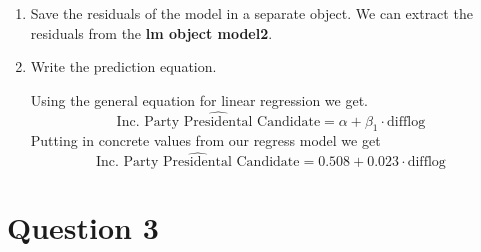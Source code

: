 \documentclass[12pt,letterpaper]{article}
\begin{document}
\begin{enumerate}
		\vspace{1.5cm}
				
		\item Save the residuals of the model in a separate object.	
		We can extract the residuals from the \textbf{lm object model2}.
		
		\vspace{1cm}
		\item Write the prediction equation.
		
		Using the general equation for linear regression we get. 
		\[\widehat{\text{Inc. Party Presidental Candidate}} = \alpha + \beta_1 \cdot \text{difflog}\]
		Putting in concrete values from our regress model we get \[\widehat{\text{Inc. Party Presidental Candidate}} = 0.508 + \text{0.023} \cdot \text{difflog}\]
	
		
	\end{enumerate}
	
	\newpage	
\section*{Question 3}
\end{document}
